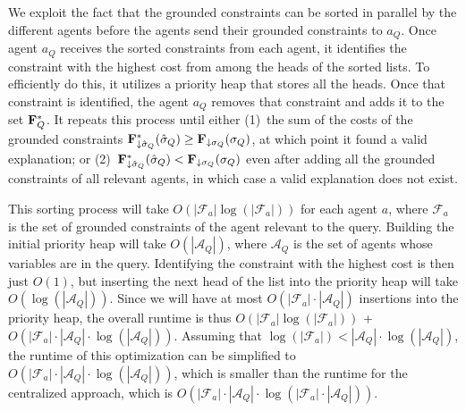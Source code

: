 \documentclass[twoside,11pt]{article}
\begin{document}
 We exploit the fact that the grounded constraints can be sorted in parallel by the different agents before the agents send their grounded constraints to $a_Q$. Once agent $a_Q$ receives the sorted constraints from each agent, it identifies the constraint with the highest cost from among the heads of the sorted lists. To efficiently do this, it utilizes a priority heap that stores all the heads. Once that constraint is identified, the agent $a_Q$ removes that constraint and adds it to the set ${\bf{F}}^*_Q$. It repeats this process until either (1)~the sum of the costs of the grounded constraints ${\bf{F}}^*_{\downarrow \hat{\sigma}_Q}(\hat{\sigma}_Q) \geq {\bf{F}}_{\downarrow \sigma_Q}(\sigma_Q)$, at which point it found a valid explanation; or (2)~${\bf{F}}^*_{\downarrow \hat{\sigma}_Q}(\hat{\sigma}_Q) < {\bf{F}}_{\downarrow \sigma_Q}(\sigma_Q)$ even after adding all the grounded constraints of all relevant agents, in which case a valid explanation does not exist. 


This sorting process will take $O(|\mathcal{F}_a| \log(|\mathcal{F}_a|))$ for each agent $a$, where $\mathcal{F}_a$ is the set of grounded constraints of the agent relevant to the query. Building the initial priority heap will take $O(|\mathcal{A}_Q|)$, where $\mathcal{A}_Q$ is the set of agents whose variables are in the query. Identifying the constraint with the highest cost is then just $O(1)$, but inserting the next head of the list into the priority heap will take $O(\log(|\mathcal{A}_Q|))$. Since we will have at most $O(|\mathcal{F}_a| \cdot |\mathcal{A}_Q|)$ insertions into the priority heap, the overall runtime is thus $O(|\mathcal{F}_a| \log(|\mathcal{F}_a|))$ + $O(|\mathcal{F}_a| \cdot |\mathcal{A}_Q| \cdot \log(|\mathcal{A}_Q|))$. Assuming that $\log(|\mathcal{F}_a|) < |\mathcal{A}_Q| \cdot \log(|\mathcal{A}_Q|)$, the runtime of this optimization can be simplified to $O(|\mathcal{F}_a| \cdot |\mathcal{A}_Q| \cdot \log(|\mathcal{A}_Q|))$, which is smaller than the runtime for the centralized approach, which is $O(|\mathcal{F}_a| \cdot |\mathcal{A}_Q| \cdot \log(|\mathcal{F}_a| \cdot |\mathcal{A}_Q|))$.



\end{document}
